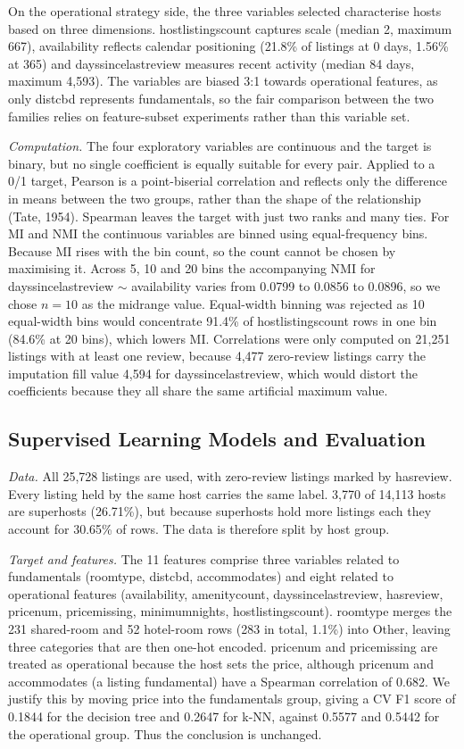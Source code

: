 \documentclass[final,1p,11pt]{elsarticle}
\renewcommand\_{\textunderscore\allowbreak}%
\begin{document}
On the operational strategy side, the three variables selected characterise hosts based on three dimensions. host\_listings\_count captures scale (median 2, maximum 667), availability\_365 reflects calendar positioning (21.8\% of listings at 0 days, 1.56\% at 365) and days\_since\_last\_review measures recent activity (median 84 days, maximum 4,593). The variables are biased 3:1 towards operational features, as only dist\_cbd represents fundamentals, so the fair comparison between the two families relies on feature-subset experiments rather than this variable set.

\textit{Computation.} The four exploratory variables are continuous and the target is binary, but no single coefficient is equally suitable for every pair. Applied to a 0/1 target, Pearson is a point-biserial correlation and reflects only the difference in means between the two groups, rather than the shape of the relationship (Tate, 1954). Spearman leaves the target with just two ranks and many ties. For MI and NMI the continuous variables are binned using equal-frequency bins. Because MI rises with the bin count, so the count cannot be chosen by maximising it. Across 5, 10 and 20 bins the accompanying NMI for days\_since\_last\_review $\sim$ availability\_365 varies from 0.0799 to 0.0856 to 0.0896, so we chose $n=10$ as the midrange value. Equal-width binning was rejected as 10 equal-width bins would concentrate 91.4\% of host\_listings\_count rows in one bin (84.6\% at 20 bins), which lowers MI. Correlations were only computed on 21,251 listings with at least one review, because 4,477 zero-review listings carry the imputation fill value 4,594 for days\_since\_last\_review, which would distort the coefficients because they all share the same artificial maximum value.

\subsection{Supervised Learning Models and Evaluation}

\textit{Data.} All 25,728 listings are used, with zero-review listings marked by has\_review. Every listing held by the same host carries the same label. 3,770 of 14,113 hosts are superhosts (26.71\%), but because superhosts hold more listings each they account for 30.65\% of rows. The data is therefore split by host group.

\textit{Target and features.} The 11 features comprise three variables related to fundamentals (room\_type\_3, dist\_cbd, accommodates) and eight related to operational features (availability\_365, amenity\_count, days\_since\_last\_review, has\_review, price\_num, price\_missing, minimum\_nights, host\_listings\_count). room\_type\_3 merges the 231 shared-room and 52 hotel-room rows (283 in total, 1.1\%) into Other, leaving three categories that are then one-hot encoded. price\_num and price\_missing are treated as operational because the host sets the price, although price\_num and accommodates (a listing fundamental) have a Spearman correlation of 0.682. We justify this by moving price into the fundamentals group, giving a CV F1 score of 0.1844 for the decision tree and 0.2647 for k-NN, against 0.5577 and 0.5442 for the operational group. Thus the conclusion is unchanged.
\end{document}

